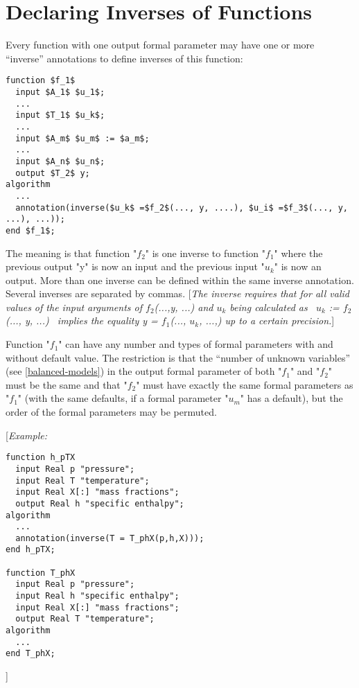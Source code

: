\section{Declaring Inverses of Functions}

Every function with one output formal parameter may have one or more
``inverse'' annotations to define inverses of this function:

\begin{lstlisting}[language=modelica,mathescape=true]
function $f_1$
  input $A_1$ $u_1$;
  ...
  input $T_1$ $u_k$;
  ...
  input $A_m$ $u_m$ := $a_m$;
  ...
  input $A_n$ $u_n$;
  output $T_2$ y;
algorithm
  ...
  annotation(inverse($u_k$ =$f_2$(..., y, ....), $u_i$ =$f_3$(..., y, ...), ...));
end $f_1$;
\end{lstlisting}

The meaning is that function "$f_2$" is one inverse to
function "$f_1$" where the previous output "y" is now an
input and the previous input "$u_k$" is now an output. More
than one inverse can be defined within the same inverse annotation.
Several inverses are separated by commas. {[}\emph{The inverse requires
that for all valid values of the input arguments of
$f_2$(...,y, ...) and $u_k$ being calculated
as~ $u_k$ := $f_2$(..., y, ...)~ implies the
equality y = $f_1$(..., $u_k$, ...,) up to a
certain precision.}{]}

Function "$f_1$" can have any number and types of formal
parameters with and without default value. The restriction is that the
``number of unknown variables'' (see \autoref{balanced-models}) in the output formal
parameter of both "$f_1$" and "$f_2$" must be
the same and that "$f_2$" must have exactly the same formal
parameters as "$f_1$" (with the same defaults, if a formal
parameter "$u_m$" has a default), but the order of the formal
parameters may be permuted.

{[}\emph{Example:}

\begin{lstlisting}[language=modelica]
function h_pTX
  input Real p "pressure";
  input Real T "temperature";
  input Real X[:] "mass fractions";
  output Real h "specific enthalpy";
algorithm
  ...
  annotation(inverse(T = T_phX(p,h,X)));
end h_pTX;

function T_phX
  input Real p "pressure";
  input Real h "specific enthalpy";
  input Real X[:] "mass fractions";
  output Real T "temperature";
algorithm
  ...
end T_phX;
\end{lstlisting}
{]}

